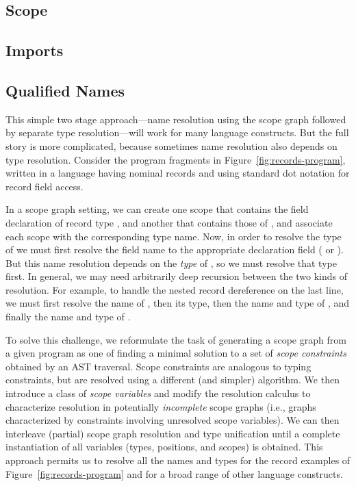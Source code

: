 \subsection{Scope}

\subsection{Imports}

\subsection{Qualified Names}

This simple two stage approach---name resolution using the
scope graph followed by separate type resolution---will work for
many language constructs. But the full story is more complicated,
because sometimes name resolution also depends on type resolution.
Consider the program fragments in Figure~\ref{fig:records-program}, written
in a language having nominal records and using standard dot notation 
for record field access. 

In a scope graph setting, we can create one scope that contains
the field declaration of record type , and another that
contains those of , and associate each scope with the
corresponding type name.
Now, in order to resolve the type of  we must first 
resolve the field name  to the appropriate
declaration field ( or ). 
But this name resolution depends on the {\it type} of ,
so we must resolve that type first.  
In general, we may need arbitrarily deep recursion between
the two kinds of resolution. For example, to handle the nested 
record dereference on the last line, we must first resolve the name
of , then its type, then the name and type of , 
and finally the name and type of . 

To solve this challenge, we 
reformulate the task of generating a scope graph from a given program
as one of finding a minimal solution to a set of {\it scope constraints}
obtained by an AST traversal.
Scope constraints are analogous to typing constraints, 
but are resolved using a different (and simpler) algorithm.
We then introduce a class of {\it scope variables} and modify
the resolution calculus to characterize resolution in potentially {\it incomplete} 
scope graphs (i.e., graphs characterized by constraints involving unresolved 
scope variables).
We can then interleave (partial) scope graph resolution and type unification 
until a complete instantiation of all variables (types, positions, and
scopes) is obtained.  This approach permits us to resolve all the names
and types for the record examples of Figure~\ref{fig:records-program} 
and for a broad range of other language constructs. 



